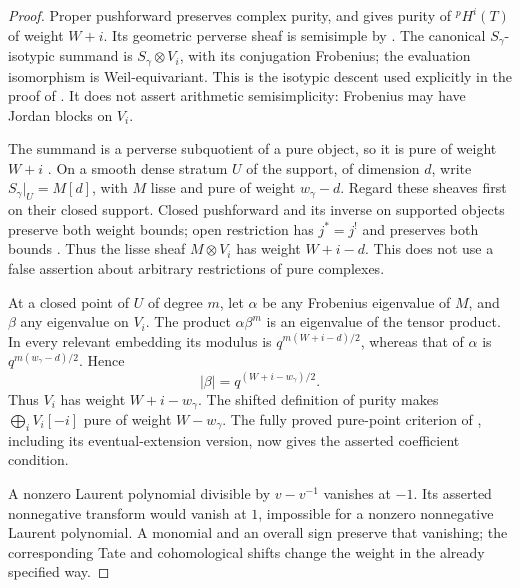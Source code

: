 \begin{proof}
Proper pushforward preserves complex purity, and
\cite[Theorem~5.4.1, p.~141; Remark~5.4.9, p.~143]{BBD}
gives purity of \({}^pH^i(T)\) of weight \(W+i\).
Its geometric perverse sheaf is semisimple by
\cite[Theorem~5.3.8, p.~138]{BBD}. The canonical
\(S_\gamma\)-isotypic summand is
\(S_\gamma\otimes V_i\), with its conjugation Frobenius;
the evaluation isomorphism is Weil-equivariant. This is
the isotypic descent used explicitly in the proof of
\cite[Proposition~5.3.9, pp.~139--140]{BBD}.
It does not assert arithmetic semisimplicity: Frobenius
may have Jordan blocks on \(V_i\).

The summand is a perverse subquotient of a pure object,
so it is pure of weight \(W+i\)
\cite[Proposition~5.3.1, pp.~134--135]{BBD}.
On a smooth dense stratum \(U\) of the support, of
dimension \(d\), write
\(S_\gamma|_U=M[d]\), with \(M\) lisse and pure of
weight \(w_\gamma-d\). Regard these sheaves first on
their closed support. Closed pushforward and its inverse
on supported objects preserve both weight bounds; open
restriction has \(j^*=j^!\) and preserves both bounds
\cite[5.1.14, p.~128]{BBD}. Thus the lisse sheaf
\(M\otimes V_i\) has weight \(W+i-d\).
This does not use a false assertion about arbitrary
restrictions of pure complexes.

At a closed point of \(U\) of degree \(m\), let
\(\alpha\) be any Frobenius eigenvalue of \(M\), and
\(\beta\) any eigenvalue on \(V_i\). The product
\(\alpha\beta^m\) is an eigenvalue of the tensor
product. In every relevant embedding its modulus is
\(q^{m(W+i-d)/2}\), whereas that of \(\alpha\) is
\(q^{m(w_\gamma-d)/2}\). Hence
\[
                    |\beta|=q^{(W+i-w_\gamma)/2}.
\]
Thus \(V_i\) has weight \(W+i-w_\gamma\).
The shifted definition of purity makes
\(\bigoplus_iV_i[-i]\) pure of weight \(W-w_\gamma\).
The fully proved pure-point criterion of ,
including its eventual-extension version, now gives
the asserted coefficient condition.

A nonzero Laurent polynomial divisible by \(v-v^{-1}\)
vanishes at \(-1\). Its asserted nonnegative transform
would vanish at \(1\), impossible for a nonzero
nonnegative Laurent polynomial. A monomial and an
overall sign preserve that vanishing; the corresponding
Tate and cohomological shifts change the weight in the
already specified way.
\end{proof}

